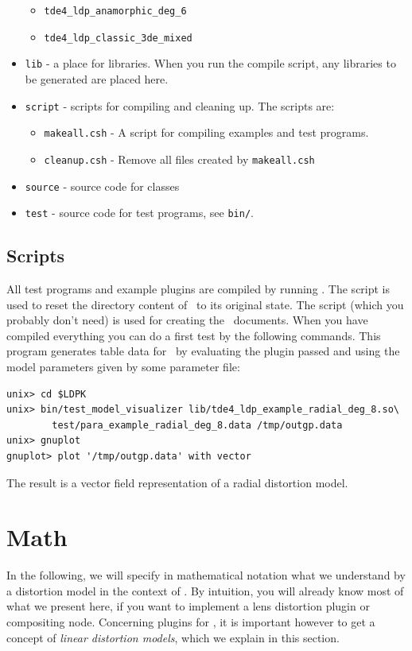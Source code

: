 \documentclass[10pt,a4paper]{article}
\begin{document}
\begin{itemize}
\begin{itemize}
\item {\tt tde4\_ldp\_anamorphic\_deg\_6}
\item {\tt tde4\_ldp\_classic\_3de\_mixed}
\end{itemize}
\item {\tt lib} - a place for libraries. When you run the compile script,
any libraries to be generated are placed here.
\item {\tt script} - scripts for compiling and cleaning up.
The scripts are:
	\begin{itemize}
	\item {\tt makeall.csh} - A script for compiling examples and test programs.
	\item {\tt cleanup.csh} - Remove all files created by {\tt makeall.csh}
	\end{itemize}
\item {\tt source} - source code for classes
\item {\tt test} - source code for test programs, see {\tt bin/}.
\end{itemize}
%
\subsection{Scripts}
All test programs and example plugins are compiled
by running .
The script  is used to reset
the directory content of \ldpk\ to its original state.
The script  (which you probably don't need) is used for
creating the \doxygen\ documents. When you have compiled everything
you can do a first test by the following commands.
This program generates table data for \gnuplot\ by evaluating the plugin
passed and using the model parameters given by some parameter file:
\begin{verbatim}
unix> cd $LDPK
unix> bin/test_model_visualizer lib/tde4_ldp_example_radial_deg_8.so\
        test/para_example_radial_deg_8.data /tmp/outgp.data
unix> gnuplot
gnuplot> plot '/tmp/outgp.data' with vector
\end{verbatim}
The result is a vector field representation of a radial distortion model.
%
%
%
\section{Math}
In the following, we will specify in mathematical notation what we understand by a distortion model
in the context of \tde. By intuition, you will already know most of what we present here, if you want to implement a lens distortion
plugin or compositing node. Concerning plugins for \tde, it is important however to get a concept of
{\em linear distortion models}, which we explain in this section.
\end{document}
